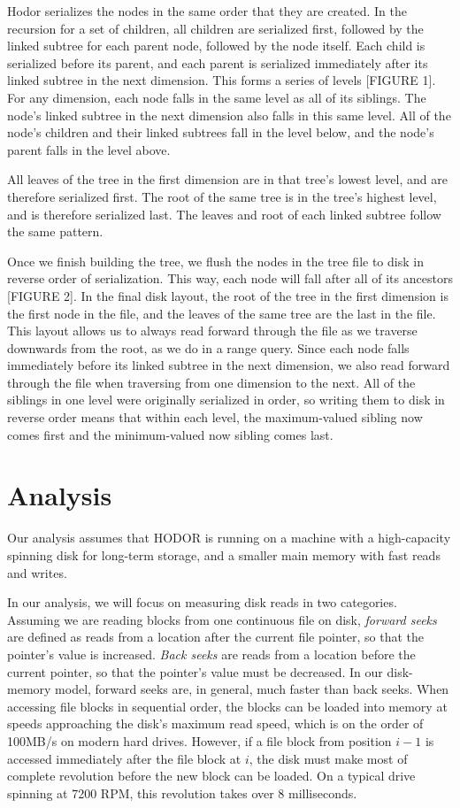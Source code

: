 \documentclass[11pt, oneside]{article}
\begin{document}
Hodor serializes the nodes in the same order that they are created. In the
recursion for a set of children, all children are serialized first, followed by
the linked subtree for each parent node, followed by the node itself. Each
child is serialized before its parent, and each parent is serialized
immediately after its linked subtree in the next dimension. This forms a series
of levels [FIGURE 1]. For any dimension, each node falls in the same level as
all of its siblings. The node's linked subtree in the next dimension also falls
in this same level. All of the node's children and their linked subtrees fall
in the level below, and the node's parent falls in the level above. 

All leaves of the tree in the first dimension are in that tree's lowest level,
and are therefore serialized first. The root of the same tree is in the tree's
highest level, and is therefore serialized last. The leaves and root of each
linked subtree follow the same pattern. 

Once we finish building the tree, we flush the nodes in the tree file to disk
in reverse order of serialization. This way, each node will fall after all of
its ancestors [FIGURE 2]. In the final disk layout, the root of the tree in the
first dimension is the first node in the file, and the leaves of the same tree
are the last in the file. This layout allows us to always read forward through
the file as we traverse downwards from the root, as we do in a range query.
Since each node falls immediately before its linked subtree in the next
dimension, we also read forward through the file when traversing from one
dimension to the next. All of the siblings in one level were originally
serialized in order, so writing them to disk in reverse order means that within
each level, the maximum-valued sibling now comes first and the minimum-valued
now sibling comes last. 

\section{Analysis}

Our analysis assumes that HODOR is running on a machine with a high-capacity
spinning disk for long-term storage, and a smaller main memory with fast 
reads and writes.

In our analysis, we will focus on measuring disk reads in two categories.
Assuming we are reading blocks from one continuous file on disk, \textit{forward
seeks} are defined as reads from a location after the current file pointer, so
that the pointer's value is increased. \textit{Back seeks} are reads from a
location before the current pointer, so that the pointer's value must be
decreased. In our disk-memory model, forward seeks are, in general, much faster
than back seeks. When accessing file blocks in sequential order, the blocks can
be loaded into memory at speeds approaching the disk's maximum read speed, which
is on the order of 100MB/s on modern hard drives. However, if a file block from
position $i-1$ is accessed immediately after the file block at $i$, the disk
must make most of complete revolution before the new block can be loaded. On a
typical drive spinning at 7200 RPM, this revolution takes over 8 milliseconds.
\end{document}

